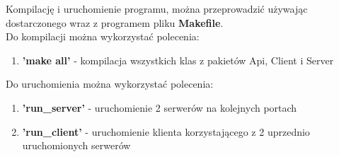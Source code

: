 \documentclass[11pt,a4paper]{article}
\begin{document}
Kompilację i uruchomienie programu, można przeprowadzić używając dostarczonego wraz z programem pliku \textbf{Makefile}.\\
Do kompilacji można wykorzystać polecenia:
\begin{enumerate}
	\item \textbf{'make all'} - kompilacja wszystkich klas z pakietów Api, Client i Server
\end{enumerate}
Do uruchomienia można wykorzystać polecenia:
\begin{enumerate}
	\item \textbf{'run\_server'} - uruchomienie 2 serwerów na kolejnych portach
	\item \textbf{'run\_client'} - uruchomienie klienta korzystającego z 2 uprzednio uruchomionych serwerów
\end{enumerate}
\end{document}
